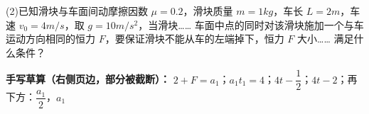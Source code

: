 \begin{problem}[粘贴印刷题·第(2)问]
(2)已知滑块与车面间动摩擦因数 $\mu=0.2$，滑块质量 $m=1\unit{kg}$，车长 $L=2\unit{m}$，车速 $v_0=4\unit{m/s}$，取 $g=10\unit{m/s^2}$，当滑块……%
车面中点的同时对该滑块施加一个与车运动方向相同的恒力 $F$，要保证滑块不能从车的左端掉下，恒力 $F$ 大小……%
满足什么条件？

\medskip
\noindent\textbf{手写草算（右侧页边，部分被截断）：}
$2+F=a_1$；\quad $a_1t_1=4$；\quad $4t-\dfrac12$；\quad $4t-2$；\quad 再下方：$\dfrac{a_1}{2}$，$a_1$%
\end{problem}
